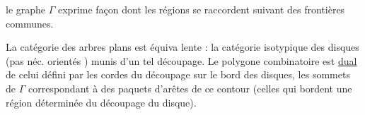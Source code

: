  le graphe $\Gamma$ exprime  façon dont les régions se raccordent suivant des frontières communes.

La catégorie des arbres plans  est équiva\unsure{-}\linebreak
lente : la catégorie isotypique des disques  (pas néc. orientés ) munis d'un tel découpage. Le polygone combinatoire  %
 est \uline{dual} de celui défini par les cordes du découpage sur le bord des disques, les sommets de $\Gamma$ correspondant à des paquets d'arêtes de ce contour (celles qui bordent une région déterminée du découpage  du disque).
